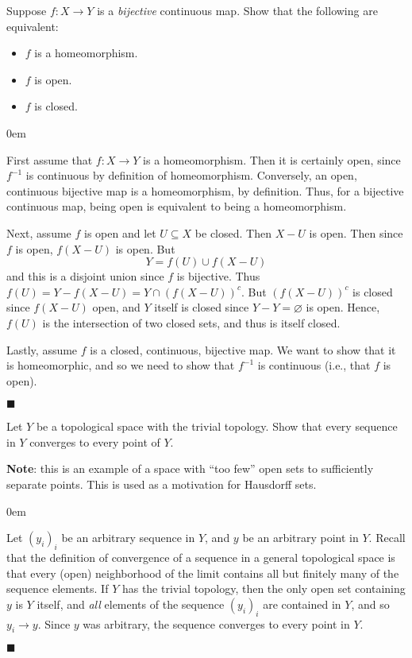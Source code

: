 \documentclass[12pt]{article}
\renewcommand{\qed}{\hfill$\blacksquare$}
\renewenvironment{proof}{\begin{addmargin}[1em]{0em}\begin{newproof}}{\end{newproof}\end{addmargin}\qed}
\newenvironment{problem}[2][Problem]{\begin{trivlist}
\item[\hskip \labelsep {\bfseries #1}\hskip \labelsep {\bfseries #2.}]}{\end{trivlist}}
\newenvironment{exercise}[2][Exercise]{\begin{trivlist}
\item[\hskip \labelsep {\bfseries #1}\hskip \labelsep {\bfseries #2.}]}{\end{trivlist}}
\begin{document}
\begin{problem}{2.29}
Suppose $f:X\rightarrow Y$ is a \textit{bijective} continuous map. Show that the following are equivalent:
\begin{itemize}
	\item $f$ is a homeomorphism.
	\item $f$ is open.
	\item $f$ is closed.
\end{itemize}
\end{problem}
\begin{proof}
First assume that $f:X\rightarrow Y$ is a homeomorphism. Then it is certainly open, since $f^{-1}$ is continuous by definition of homeomorphism. Conversely, an open, continuous bijective map is a homeomorphism, by definition. Thus, for a bijective continuous map, being open is equivalent to being a homeomorphism.

Next, assume $f$ is open and let $U\subseteq X$ be closed. Then $X-U$ is open. Then since $f$ is open, $f\left(X-U\right)$ is open. But $$ Y = f\left(U\right)\cup f\left(X-U\right)$$ and this is a disjoint union since $f$ is bijective. Thus $f\left(U\right) = Y - f\left(X-U\right) = Y\cap \left(f\left(X-U\right)\right)^c$. But $\left(f\left(X-U\right)\right)^c$ is closed since $f\left(X-U\right)$ open, and $Y$ itself is closed since $Y-Y=\varnothing$ is open. Hence, $f\left(U\right)$ is the intersection of two closed sets, and thus is itself closed.

Lastly, assume $f$ is a closed, continuous, bijective map. We want to show that it is homeomorphic, and so we need to show that $f^{-1}$ is continuous (i.e., that $f$ is open).
\end{proof}




\begin{exercise}{2.33}
Let $Y$ be a topological space with the trivial topology. Show that every sequence in $Y$ converges to every point of $Y$.
\end{exercise}
\textbf{Note}: this is an example of a space with ``too few'' open sets to sufficiently separate points. This is used as a motivation for Hausdorff sets.\\
\begin{proof}
Let $\left(y_i\right)_i$ be an arbitrary sequence in $Y$, and $y$ be an arbitrary point in $Y$. Recall that the definition of convergence of a sequence in a general topological space is that every (open) neighborhood of the limit contains all but finitely many of the sequence elements. If $Y$ has the trivial topology, then the only open set containing $y$ is $Y$ itself, and \textit{all} elements of the sequence $\left(y_i\right)_i$ are contained in $Y$, and so $y_i \rightarrow y$. Since $y$ was arbitrary, the sequence converges to every point in $Y$.
\end{proof}
\end{document}
